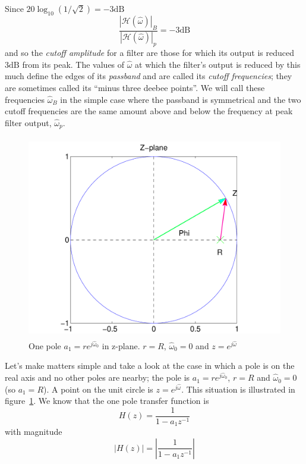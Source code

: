 Since $20\log_{10}(1/\sqrt{2})=-3\mathrm{dB}$
\begin{equation}
\frac{|\mathcal{H}(\hat{\omega})|_B}{|\mathcal{H}(\hat{\omega})|_p} 
  = -3\mathrm{dB}
\end{equation}
and so the \emph{cutoff amplitude} for a filter are those for which
its output is reduced $3\mathrm{dB}$ from its peak.
The values of $\hat{\omega}$ at which the filter's output is reduced
by this much define the edges of its \emph{passband} and are called
its \emph{cutoff frequencies}; they are sometimes called
its ``minus three deebee points''.
We will call these frequencies $\hat{\omega}_B$ in the simple case
where the passband is symmetrical and the two cutoff frequencies are
the same amount above and below the frequency at peak filter output,
$\hat{\omega}_p$.

\begin{figure}
\centerline{\includegraphics[height=3.5in]{ch-iir/fbexp_1p_c0_phi}}
\caption{One pole $a_1=re^{j\hat{\omega}_0}$ in z-plane. $r=R$,
$\hat{\omega}_0=0$ and $z=e^{j\hat{\omega}}$
\label{fig:fb-exp1pc0_phi}}
\end{figure}

Let's make matters simple and take a look at the case in which a pole
is on the real axis and no other poles are nearby; the pole is
$a_1=re^{j\hat{\omega}_0}$, $r=R$ and $\hat{\omega}_0=0$ (so
$a_1=R$). A point on the unit circle is $z=e^{j\hat{\omega}}$. This
situation is illustrated in figure~\ref{fig:fb-exp1pc0_phi}.  We know
that the one pole transfer function is
\begin{equation}
H(z)=\frac{1}{1-a_1z^{-1}}
\end{equation}
with magnitude 
\begin{equation}
|H(z)|=\left|\frac{1}{1-a_1z^{-1}}\right| \label{eq:reson-mag}
\end{equation}

